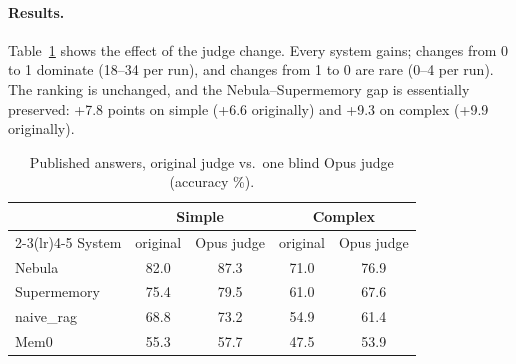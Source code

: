 \documentclass[11pt]{article}
\begin{document}
\paragraph{Results.} Table~\ref{tab:rejudge} shows the effect of the judge change. Every system gains; changes from 0 to 1 dominate (18--34 per run), and changes from 1 to 0 are rare (0--4 per run). The ranking is unchanged, and the Nebula--Supermemory gap is essentially preserved: +7.8 points on simple (+6.6 originally) and +9.3 on complex (+9.9 originally).

\begin{table}[h]
\centering\small
\begin{tabular}{lcccc}
\toprule
& \multicolumn{2}{c}{Simple} & \multicolumn{2}{c}{Complex}\\
\cmidrule(lr){2-3}\cmidrule(lr){4-5}
System & original & Opus judge & original & Opus judge\\
\midrule
Nebula & 82.0 & 87.3 & 71.0 & 76.9\\
Supermemory & 75.4 & 79.5 & 61.0 & 67.6\\
naive\_rag & 68.8 & 73.2 & 54.9 & 61.4\\
Mem0 & 55.3 & 57.7 & 47.5 & 53.9\\
\bottomrule
\end{tabular}
\caption{Published answers, original judge vs.\ one blind Opus judge (accuracy \%).}
\label{tab:rejudge}
\end{table}
\end{document}
